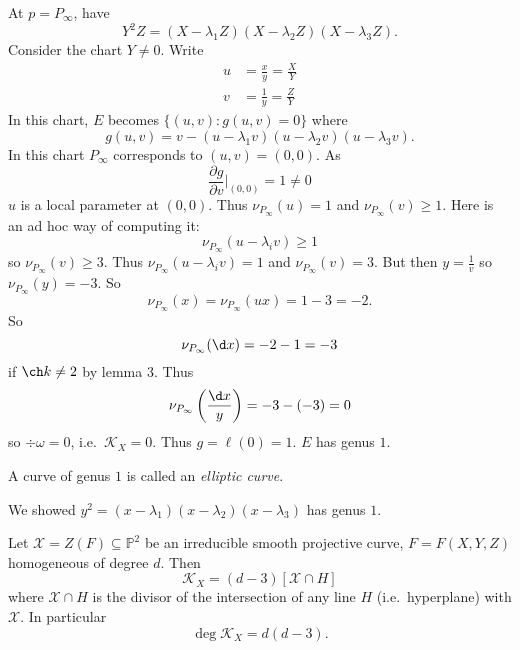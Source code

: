 \documentclass[a4paper]{article}
\renewcommand*{\P}{\mathbb{P}}
\begin{document}
\begin{eg}
\begin{enumerate}
    At \(p = P_\infty\), have
    \[
      Y^2Z = (X - \lambda_1Z)(X - \lambda_2Z)(X - \lambda_3Z).
    \]
    Consider the chart \(Y \neq 0\). Write
    \begin{align*}
      u &= \frac{x}{y} = \frac{X}{Y} \\
      v &= \frac{1}{y} = \frac{Z}{Y}
    \end{align*}
    In this chart, \(E\) becomes \(\{(u, v): g(u, v) = 0\}\) where
    \[
      g(u, v) = v - (u - \lambda_1v)(u - \lambda_2v)(u - \lambda_3v).
    \]
    In this chart \(P_\infty\) corresponds to \((u, v) = (0, 0)\). As
    \[
      \frac{\partial g}{\partial v}\Big|_{(0, 0)} = 1 \neq 0
    \]
    \(u\) is a local parameter at \((0, 0)\). Thus \(\nu_{P_\infty}(u) = 1\) and \(\nu_{P_\infty}(v) \geq 1\). Here is an ad hoc way of computing it:
    \[
      \nu_{P_\infty}(u - \lambda_i v) \geq 1
    \]
    so \(\nu_{P_\infty}(v) \geq 3\). Thus \(\nu_{P_\infty}(u - \lambda_i v) = 1\) and \(\nu_{P_\infty}(v) = 3\). But then \(y = \frac{1}{v}\) so \(\nu_{P_\infty}(y) = -3\). So
    \[
      \nu_{P_\infty}(x) = \nu_{P_\infty}(ux) = 1 - 3 = -2.
    \]
    So
    \[
      \nu_{P_\infty}(\d x) = -2 - 1 = -3
    \]
    if \(\ch k \neq 2\) by lemma 3. Thus
    \[
      \nu_{P_\infty} \left(\frac{\d x}{y}\right) = -3 - (-3) = 0
    \]
    so \(\div \omega = 0\), i.e.\ \(\mathcal K_X = 0\). Thus \(g = \ell(0) = 1\). \(E\) has genus \(1\).
  \end{enumerate}
\end{eg}

\begin{definition}
  A curve of genus \(1\) is called an \emph{elliptic curve}.
\end{definition}
We showed \(y^2 = (x - \lambda_1)(x - \lambda_2)(x - \lambda_3)\) has genus \(1\).

\begin{proposition}
  Let \(\mathcal X = Z(F) \subseteq \P^2\) be an irreducible smooth projective curve, \(F = F(X, Y, Z)\) homogeneous of degree \(d\). Then
  \[
    \mathcal K_X = (d - 3) [\mathcal X \cap H]
  \]
  where \(\mathcal X \cap H\) is the divisor of the intersection of any line \(H\) (i.e.\ hyperplane) with \(\mathcal X\). In particular
  \[
    \deg \mathcal K_X = d(d - 3).
  \]
\end{proposition}
\end{document}
